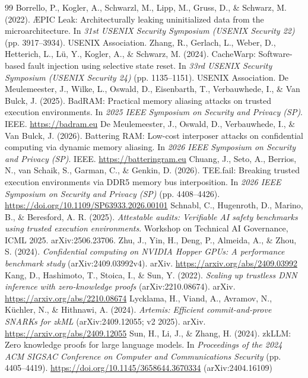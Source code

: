 \documentclass[11pt]{article}
\begin{document}
\begin{thebibliography}{99}
 Borrello, P., Kogler, A., Schwarzl, M., Lipp, M., Gruss, D., \& Schwarz, M. (2022). \AE{}PIC Leak: Architecturally leaking uninitialized data from the microarchitecture. In \emph{31st USENIX Security Symposium (USENIX Security 22)} (pp. 3917--3934). USENIX Association.
 Zhang, R., Gerlach, L., Weber, D., Hetterich, L., L\"{u}, Y., Kogler, A., \& Schwarz, M. (2024). CacheWarp: Software-based fault injection using selective state reset. In \emph{33rd USENIX Security Symposium (USENIX Security 24)} (pp. 1135--1151). USENIX Association.
 De Meulemeester, J., Wilke, L., Oswald, D., Eisenbarth, T., Verbauwhede, I., \& Van Bulck, J. (2025). BadRAM: Practical memory aliasing attacks on trusted execution environments. In \emph{2025 IEEE Symposium on Security and Privacy (SP)}. IEEE. \url{https://badram.eu}
 De Meulemeester, J., Oswald, D., Verbauwhede, I., \& Van Bulck, J. (2026). Battering RAM: Low-cost interposer attacks on confidential computing via dynamic memory aliasing. In \emph{2026 IEEE Symposium on Security and Privacy (SP)}. IEEE. \url{https://batteringram.eu}
 Chuang, J., Seto, A., Berrios, N., van Schaik, S., Garman, C., \& Genkin, D. (2026). TEE.fail: Breaking trusted execution environments via DDR5 memory bus interposition. In \emph{2026 IEEE Symposium on Security and Privacy (SP)} (pp. 4408--4426). \url{https://doi.org/10.1109/SP63933.2026.00101}
 Schnabl, C., Hugenroth, D., Marino, B., \& Beresford, A. R. (2025). \emph{Attestable audits: Verifiable AI safety benchmarks using trusted execution environments}. Workshop on Technical AI Governance, ICML 2025. arXiv:2506.23706.
 Zhu, J., Yin, H., Deng, P., Almeida, A., \& Zhou, S. (2024). \emph{Confidential computing on NVIDIA Hopper GPUs: A performance benchmark study} (arXiv:2409.03992v4). arXiv. \url{https://arxiv.org/abs/2409.03992}
 Kang, D., Hashimoto, T., Stoica, I., \& Sun, Y. (2022). \emph{Scaling up trustless DNN inference with zero-knowledge proofs} (arXiv:2210.08674). arXiv. \url{https://arxiv.org/abs/2210.08674}
 Lycklama, H., Viand, A., Avramov, N., K\"{u}chler, N., \& Hithnawi, A. (2024). \emph{Artemis: Efficient commit-and-prove SNARKs for zkML} (arXiv:2409.12055; v2 2025). arXiv. \url{https://arxiv.org/abs/2409.12055}
 Sun, H., Li, J., \& Zhang, H. (2024). zkLLM: Zero knowledge proofs for large language models. In \emph{Proceedings of the 2024 ACM SIGSAC Conference on Computer and Communications Security} (pp. 4405--4419). \url{https://doi.org/10.1145/3658644.3670334} (arXiv:2404.16109)

\end{thebibliography}
\end{document}
